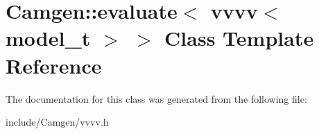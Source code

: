\hypertarget{a00211}{}\section{Camgen\+:\+:evaluate$<$ vvvv$<$ model\+\_\+t $>$ $>$ Class Template Reference}
\label{a00211}


The documentation for this class was generated from the following file\+:\begin{DoxyCompactItemize}
\item 
include/\+Camgen/vvvv.\+h\end{DoxyCompactItemize}
